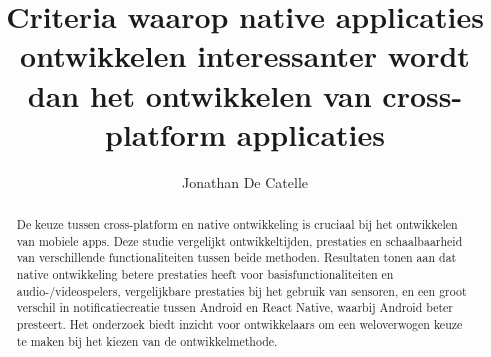 \documentclass[a0,portrait]{hogent-poster}
\title{Criteria waarop native applicaties ontwikkelen interessanter wordt dan 
het ontwikkelen van cross-platform applicaties}
\author{Jonathan De Catelle}
\begin{document}
\maketitle

\begin{abstract}
De keuze tussen cross-platform en native ontwikkeling is cruciaal bij het ontwikkelen 
van mobiele apps. Deze studie vergelijkt ontwikkeltijden, prestaties en schaalbaarheid 
van verschillende functionaliteiten tussen beide methoden. Resultaten tonen aan dat 
native ontwikkeling betere prestaties heeft voor basisfunctionaliteiten en audio-/videospelers, 
vergelijkbare prestaties bij het gebruik van sensoren, en een groot verschil in 
notificatiecreatie tussen Android en React Native, waarbij Android beter presteert. 
Het onderzoek biedt inzicht voor ontwikkelaars om een weloverwogen keuze te maken bij 
het kiezen van de ontwikkelmethode.
\end{abstract}
\end{document}
